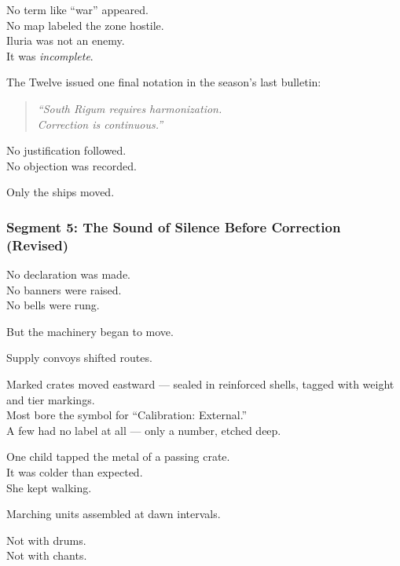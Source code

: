 \documentclass[9pt]{article}
\begin{document}
\vspace{1em}

No term like “war” appeared.\\
No map labeled the zone hostile.\\
Iluria was not an enemy.\\
It was \textit{incomplete}.

\vspace{1em}

The Twelve issued one final notation in the season’s last bulletin:

\begin{quote}
\textit{“South Rigum requires harmonization.}\\
\textit{Correction is continuous.”}
\end{quote}

No justification followed.\\
No objection was recorded.

Only the ships moved.

\newpage

\subsubsection*{Segment 5: The Sound of Silence Before Correction (Revised)}

No declaration was made.\\
No banners were raised.\\
No bells were rung.

But the machinery began to move.

\vspace{1em}

Supply convoys shifted routes.

Marked crates moved eastward — sealed in reinforced shells, tagged with weight and tier markings.\\
Most bore the symbol for “Calibration: External.”\\
A few had no label at all — only a number, etched deep.

One child tapped the metal of a passing crate.\\
It was colder than expected.\\
She kept walking.

\vspace{1em}

Marching units assembled at dawn intervals.

Not with drums.\\
Not with chants.
\end{document}
